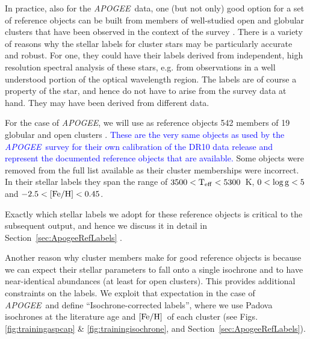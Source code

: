 \documentclass[12pt, preprint]{aastex}
\newcommand{\sectionname}{Section}
\newcommand{\apogee}{\textsl{APOGEE}}
\newcommand{\teff}{\mbox{$\rm T_{eff}$}}
\newcommand{\feh}{\mbox{$\rm [Fe/H]$}}
\newcommand{\logg}{\mbox{$\rm \log g$}}
\begin{document}
In practice, also for the \apogee\ data, one (but not only) good option
for a set of reference objects can be built from 
members of well-studied open and globular clusters that have been observed in the context of the survey \citep{Zaso2013, Meszaros2013}.
There is a variety of reasons why the stellar labels for cluster stars may be particularly accurate and robust.
For one, they could have their labels derived from independent, high resolution spectral analysis of these
stars, e.g. from observations in a well understood portion of the optical wavelength region. The
labels are of course a property of the
star, and hence do not have to arise from the survey data at hand. They may have been derived from different data.

For the case of \apogee, we will use as reference objects 542 members of 19 globular and open clusters \citep{Meszaros2013}. \textcolor{blue}{These are the very same objects as used by the \apogee\ survey for their own calibration of the DR10 data release and represent the documented reference objects that are available. }Some objects were removed from the full list available as their cluster memberships were incorrect. In their stellar labels they span the range of $3500<\teff<5300$~K, $0<\logg<5$ and $-2.5<\feh<0.45$. 

Exactly which stellar labels we adopt for these reference objects is critical to the subsequent output, and hence 
we discuss it in detail in \sectionname~\ref{sec:ApogeeRefLabels} .

Another reason why cluster members make for good reference objects is because we can expect their stellar parameters to fall onto a single isochrone and to have near-identical abundances (at least for open clusters). This provides additional constraints on the labels.
We exploit that expectation in the case of \apogee\ and define ``Isochrone-corrected labels'', where we use Padova isochrones at the literature age and \feh\ of each cluster (see Figs. \ref{fig:trainingaspcap} \& \ref{fig:trainingisochrone}, and \sectionname~\ref{sec:ApogeeRefLabels}).
\end{document}
